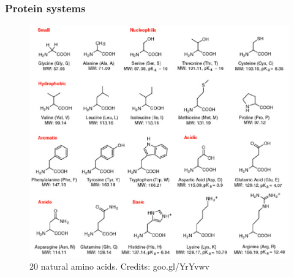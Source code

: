 \documentclass{beamer}
\begin{document}
\begin{frame}\frametitle{Protein systems}

\begin{figure}
\includegraphics[scale=0.3]{aminoacids.eps}
\caption{{\scriptsize 20 natural amino acids. Credits: goo.gl/YrYvwv}}
\end{figure}

\end{frame}
\end{document}
